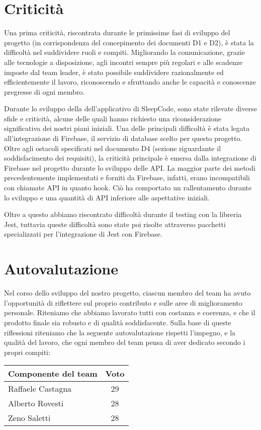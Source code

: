 \documentclass[11pt, a4paper]{article}
\theoremstyle{definition}
\begin{document}
\section{Criticità}
Una prima criticità, riscontrata durante le primissime fasi di sviluppo del progetto
(in corrispondenza del concepimento dei documenti D1 e D2),
è stata la difficoltà nel suddividere ruoli e compiti.
Migliorando la comunicazione, grazie alle tecnologie a disposizione,
agli incontri sempre più regolari e alle scadenze imposte dal
team leader, è stato possibile suddividere
razionalmente ed efficientemente il lavoro, riconoscendo e sfruttando
anche le capacità e conoscenze pregresse di ogni membro.

Durante lo sviluppo della dell’applicativo di SleepCode, sono state rilevate diverse sfide e criticità, alcune delle quali hanno richiesto una riconsiderazione significativa dei nostri piani iniziali. Una delle principali difficoltà è stata legata all'integrazione di Firebase, il servizio di database scelto per questo progetto.
Oltre agli ostacoli specificati nel documento D4 (sezione riguardante il soddisfacimento dei requisiti),
la criticità principale è emersa dalla integrazione di Firebase nel progetto durante lo sviluppo delle API. La maggior parte dei metodi precedentemente implementati e forniti da Firebase, infatti, erano incompatibili con chiamate API in quanto hook. Ciò ha comportato un rallentamento durante lo sviluppo e una quantità di API inferiore alle aspettative iniziali.

Oltre a questo abbiamo riscontrato difficoltà durante il testing con la libreria Jest, tuttavia queste difficoltà sono state poi risolte attraverso pacchetti specializzati per l’integrazione di Jest con Firebase.


\section{Autovalutazione}
Nel corso dello sviluppo del nostro progetto, ciascun membro del team ha avuto l'opportunità di riflettere sul proprio contributo e sulle aree di miglioramento personale. Riteniamo che abbiamo lavorato tutti con costanza e coerenza, e che il prodotto finale sia robusto e di qualità soddisfacente.
Sulla base di queste riflessioni riteniamo che la seguente autovalutazione rispetti l’impegno, e la qualità del lavoro, che ogni membro del team pensa di aver dedicato secondo i propri compiti:

\begin{center}
    \begin{tabularx}{0.5\textwidth}{|X||c|}
        \hline
        \cellcolor{red!70}Componente del team & \cellcolor{red!70}Voto\\
        \hline
        Raffaele Castagna & 29\\
        \hline
        Alberto Rovesti & 28\\
        \hline
        Zeno Saletti & 28\\
        \hline
    \end{tabularx}
\end{center}
\end{document}
